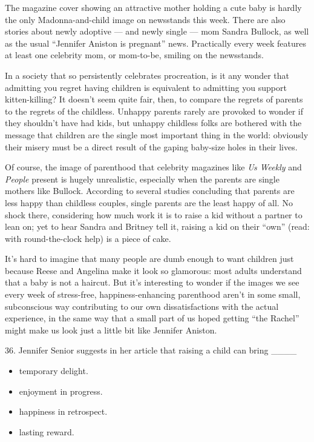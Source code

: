 \documentclass[UTF8,11pt]{ctexart}
\begin{document}
The magazine cover showing an attractive mother holding a cute baby is hardly the only Madonna-and-child image on newsstands this week. There are also stories about newly adoptive — and newly single — mom Sandra Bullock, as well as the usual “Jennifer Aniston is pregnant” news. Practically every week features at least one celebrity mom, or mom-to-be, smiling on the newsstands.


In a society that so persistently celebrates procreation, is it any wonder that admitting you regret having children is equivalent to admitting you support kitten-killing? It doesn't seem quite fair, then, to compare the regrets of parents to the regrets of the childless. Unhappy parents rarely are provoked to wonder if they shouldn't have had kids, but unhappy childless folks are bothered with the message that children are the single most important thing in the world: obviously their misery must be a direct result of the gaping baby-size holes in their lives.


Of course, the image of parenthood that celebrity magazines like \textit{Us Weekly} and \textit{People} present is hugely unrealistic, especially when the parents are single mothers like Bullock. According to several studies concluding that parents are less happy than childless couples, single parents are the least happy of all. No shock there, considering how much work it is to raise a kid without a partner to lean on; yet to hear Sandra and Britney tell it, raising a kid on their “own” (read: with round-the-clock help) is a piece of cake.


It's hard to imagine that many people are dumb enough to want children just because Reese and Angelina make it look so glamorous: most adults understand that a baby is not a haircut. But it's interesting to wonder if the images we see every week of stress-free, happiness-enhancing parenthood aren't in some small, subconscious way contributing to our own dissatisfactions with the actual experience, in the same way that a small part of us hoped getting “the Rachel” might make us look just a little bit like Jennifer Aniston.


36. Jennifer Senior suggests in her article that raising a child can bring \_\_\_\_


\begin{itemize}[leftmargin=2em,itemsep=.2em,topsep=.4em]\item[A.] temporary delight.
\item[B.] enjoyment in progress.
\item[C.] happiness in retrospect.
\item[D.] lasting reward.
\end{itemize}
\end{document}
